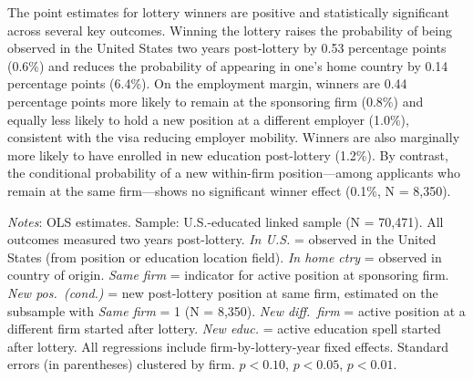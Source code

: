 The point estimates for lottery winners are positive and statistically significant across several key outcomes. Winning the lottery raises the probability of being observed in the United States two years post-lottery by 0.53 percentage points (0.6\%\sym{***}) and reduces the probability of appearing in one's home country by 0.14 percentage points (6.4\%\sym{**}). On the employment margin, winners are 0.44 percentage points more likely to remain at the sponsoring firm (0.8\%\sym{**}) and equally less likely to hold a new position at a different employer (1.0\%\sym{**}), consistent with the visa reducing employer mobility. Winners are also marginally more likely to have enrolled in new education post-lottery (1.2\%\sym{*}). By contrast, the conditional probability of a new within-firm position---among applicants who remain at the same firm---shows no significant winner effect (0.1\%, N = 8,350).

\begin{table}[htbp]
\centering
\caption{Main Effects of H-1B Lottery Selection: Two Years Post-Lottery}
\label{tab:main_results}
\footnotesize

\begin{tablenotes}
\item \textit{Notes}: OLS estimates. Sample: U.S.-educated linked sample (N = 70,471). All outcomes measured two years post-lottery. \textit{In U.S.} = observed in the United States (from position or education location field). \textit{In home ctry} = observed in country of origin. \textit{Same firm} = indicator for active position at sponsoring firm. \textit{New pos.\ (cond.)} = new post-lottery position at same firm, estimated on the subsample with \textit{Same firm} = 1 (N = 8,350). \textit{New diff.\ firm} = active position at a different firm started after lottery. \textit{New educ.} = active education spell started after lottery. All regressions include firm-by-lottery-year fixed effects. Standard errors (in parentheses) clustered by firm. \sym{*} $p<0.10$, \sym{**} $p<0.05$, \sym{***} $p<0.01$.
\end{tablenotes}
\end{table}



